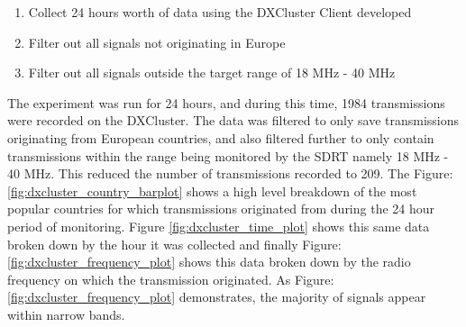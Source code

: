 \documentclass[runningheads,a4paper]{llncs}
\begin{document}
\begin{enumerate}
	\item Collect 24 hours worth of data using the \gls{DXCluster} Client developed
	\item Filter out all signals not originating in Europe
	\item Filter out all signals outside the target range of 18 MHz - 40 MHz
\end{enumerate}

The experiment was run for 24 hours, and during this time, 1984 transmissions were recorded on the \gls{DXCluster}. The data was filtered to only save transmissions originating from European countries, and also filtered further to only contain transmissions within the range being monitored by the SDRT namely 18 MHz - 40 MHz. This reduced the number of transmissions recorded to 209. The Figure: \ref{fig:dxcluster_country_barplot} shows a high level breakdown of the most popular countries for which transmissions originated from during the 24 hour period of monitoring. Figure \ref{fig:dxcluster_time_plot} shows this same data broken down by the hour it was collected and finally Figure: \ref{fig:dxcluster_frequency_plot} shows this data broken down by the radio frequency on which the transmission originated. As Figure: \ref{fig:dxcluster_frequency_plot} demonstrates, the majority of signals appear within narrow bands.
\end{document}
